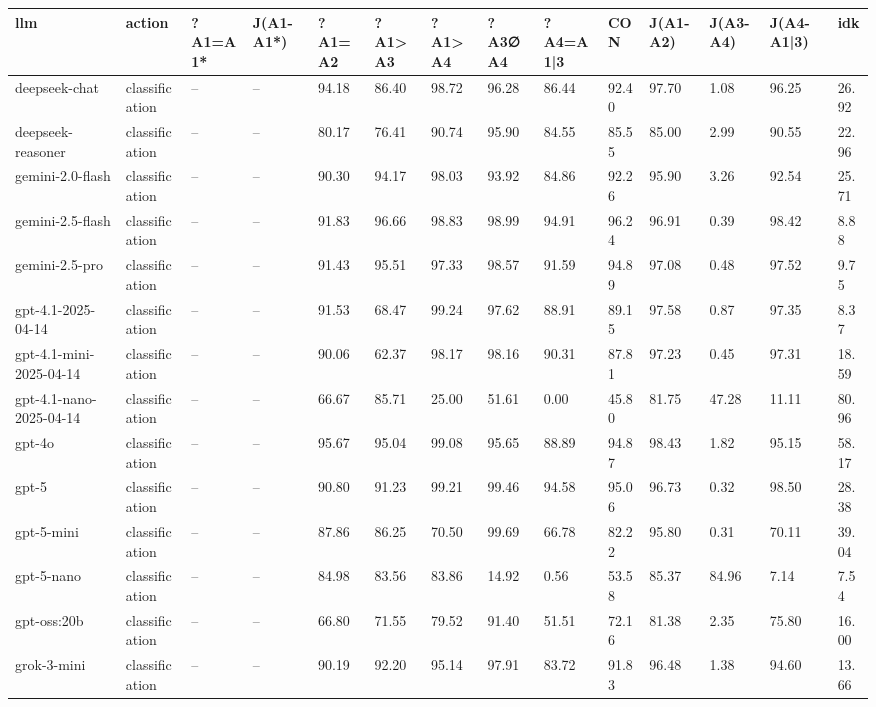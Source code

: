 \begin{table}[!t]
\centering\scriptsize
\begin{tabular}{llllllllllllll}
\toprule
llm & action & ?A1=A1* & J(A1-A1*) & ?A1=A2 & ?A1>A3 & ?A1>A4 & ?A3∅A4 & ?A4=A1|3 & CON & J(A1-A2) & J(A3-A4) & J(A4-A1|3) & idk \\
\midrule
deepseek-chat & classification & -- & -- & 94.18 & 86.40 & 98.72 & 96.28 & 86.44 & 92.40 & 97.70 & 1.08 & 96.25 & 26.92 \\
deepseek-reasoner & classification & -- & -- & 80.17 & 76.41 & 90.74 & 95.90 & 84.55 & 85.55 & 85.00 & 2.99 & 90.55 & 22.96 \\
gemini-2.0-flash & classification & -- & -- & 90.30 & 94.17 & 98.03 & 93.92 & 84.86 & 92.26 & 95.90 & 3.26 & 92.54 & 25.71 \\
gemini-2.5-flash & classification & -- & -- & 91.83 & 96.66 & 98.83 & 98.99 & 94.91 & 96.24 & 96.91 & 0.39 & 98.42 & 8.88 \\
gemini-2.5-pro & classification & -- & -- & 91.43 & 95.51 & 97.33 & 98.57 & 91.59 & 94.89 & 97.08 & 0.48 & 97.52 & 9.75 \\
gpt-4.1-2025-04-14 & classification & -- & -- & 91.53 & 68.47 & 99.24 & 97.62 & 88.91 & 89.15 & 97.58 & 0.87 & 97.35 & 8.37 \\
gpt-4.1-mini-2025-04-14 & classification & -- & -- & 90.06 & 62.37 & 98.17 & 98.16 & 90.31 & 87.81 & 97.23 & 0.45 & 97.31 & 18.59 \\
gpt-4.1-nano-2025-04-14 & classification & -- & -- & 66.67 & 85.71 & 25.00 & 51.61 & 0.00 & 45.80 & 81.75 & 47.28 & 11.11 & 80.96 \\
gpt-4o & classification & -- & -- & 95.67 & 95.04 & 99.08 & 95.65 & 88.89 & 94.87 & 98.43 & 1.82 & 95.15 & 58.17 \\
gpt-5 & classification & -- & -- & 90.80 & 91.23 & 99.21 & 99.46 & 94.58 & 95.06 & 96.73 & 0.32 & 98.50 & 28.38 \\
gpt-5-mini & classification & -- & -- & 87.86 & 86.25 & 70.50 & 99.69 & 66.78 & 82.22 & 95.80 & 0.31 & 70.11 & 39.04 \\
gpt-5-nano & classification & -- & -- & 84.98 & 83.56 & 83.86 & 14.92 & 0.56 & 53.58 & 85.37 & 84.96 & 7.14 & 7.54 \\
gpt-oss:20b & classification & -- & -- & 66.80 & 71.55 & 79.52 & 91.40 & 51.51 & 72.16 & 81.38 & 2.35 & 75.80 & 16.00 \\
grok-3-mini & classification & -- & -- & 90.19 & 92.20 & 95.14 & 97.91 & 83.72 & 91.83 & 96.48 & 1.38 & 94.60 & 13.66 \\

\end{tabular}
\end{table}
